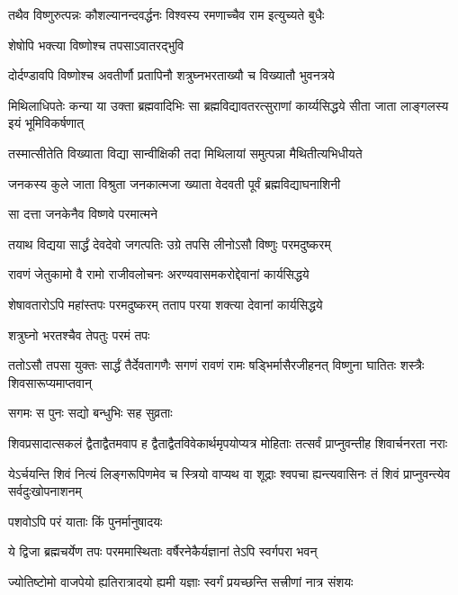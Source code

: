 \twolineshloka
{तथैव विष्णुरुत्पन्नः कौशल्यानन्दवर्द्धनः}
{विश्वस्य रमणाच्चैव राम इत्युच्यते बुधैः}%

\onelineshloka
{शेषोपि भक्त्या विष्णोश्च तपसाऽवातरद्भुवि}%

\twolineshloka
{दोर्दण्डावपि विष्णोश्च अवतीर्णौ प्रतापिनौ}
{शत्रुघ्नभरताख्यौ च विख्यातौ भुवनत्रये}%

\threelineshloka
{मिथिलाधिपतेः कन्या या उक्ता ब्रह्मवादिभिः}
{सा ब्रह्मविद्यावतरत्सुराणां कार्य्यसिद्धये}
{सीता जाता लाङ्गलस्य इयं भूमिविकर्षणात्}%

\twolineshloka
{तस्मात्सीतेति विख्याता विद्या सान्वीक्षिकी तदा}
{मिथिलायां समुत्पन्ना मैथितीत्यभिधीयते}%

\twolineshloka
{जनकस्य कुले जाता विश्रुता जनकात्मजा}
{ख्याता वेदवती पूर्वं ब्रह्मविद्याघनाशिनी}%

\onelineshloka
{सा दत्ता जनकेनैव विष्णवे परमात्मने}%

\twolineshloka
{तयाथ विद्यया सार्द्धं देवदेवो जगत्पतिः}
{उग्रे तपसि लीनोऽसौ विष्णुः परमदुष्करम्}%

\twolineshloka
{रावणं जेतुकामो वै रामो राजीवलोचनः}
{अरण्यवासमकरोद्देवानां कार्यसिद्धये}%

\twolineshloka
{शेषावतारोऽपि महांस्तपः परमदुष्करम्}
{तताप परया शक्त्या देवानां कार्यसिद्धये}%

\onelineshloka
{शत्रुघ्नो भरतश्चैव तेपतुः परमं तपः}%

\threelineshloka
{ततोऽसौ तपसा युक्तः सार्द्धं तैर्देवतागणैः}
{सगणं रावणं रामः षड्भिर्मासैरजीहनत्}
{विष्णुना घातितः शस्त्रैः शिवसारूप्यमाप्तवान्}%

\onelineshloka
{सगमः स पुनः सद्यो बन्धुभिः सह सुव्रताः}%

\threelineshloka
{शिवप्रसादात्सकलं द्वैताद्वैतमवाप ह}
{द्वैताद्वैतविवेकार्थमृपयोप्यत्र मोहिताः}
{तत्सर्वं प्राप्नुवन्तीह शिवार्चनरता नराः}%

\threelineshloka
{येऽर्चयन्ति शिवं नित्यं लिङ्गरूपिणमेव च}
{स्त्रियो वाप्यथ वा शूद्राः श्वपचा ह्यन्त्यवासिनः}
{तं शिवं प्राप्नुवन्त्येव सर्वदुःखोपनाशनम्}%

\onelineshloka
{पशवोऽपि परं याताः किं पुनर्मानुषादयः}%

\twolineshloka
{ये द्विजा ब्रह्मचर्येण तपः परममास्थिताः}
{वर्षैरनेकैर्यज्ञानां तेऽपि स्वर्गपरा भवन्}%

\twolineshloka
{ज्योतिष्टोमो वाजपेयो ह्यतिरात्रादयो ह्यमी}
{यज्ञाः स्वर्गं प्रयच्छन्ति सत्त्रीणां नात्र संशयः}%

